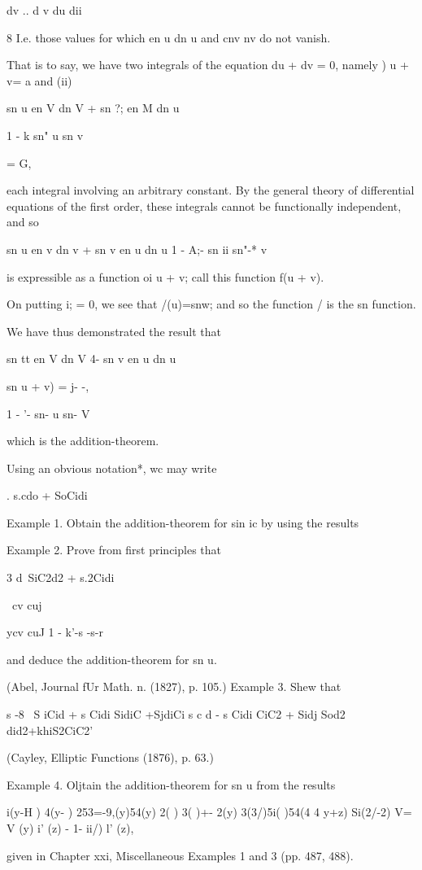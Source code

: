 dv .. d v du dii

8 I.e. those values for which en u dn u and cnv nv do not vanish.

%
%

That is to say, we have two integrals of the equation du + dv = 0,
namely ) u + v= a and (ii)

sn u en V dn V + sn ?; en M dn u

1 - k sn" u sn v

= G,

each integral involving an arbitrary constant. By the general theory
of differential equations of the first order, these integrals cannot
be functionally independent, and so

sn u en v dn v + sn v en u dn u 1 - A;- sn ii sn"-* v

is expressible as a function oi u + v; call this function f(u + v).

On putting i; = 0, we see that /(u)=snw; and so the function / is the
sn function.

We have thus demonstrated the result that

sn tt en V dn V 4- sn v en u dn u

sn u + v) = j- -,

1 - '- sn- u sn- V

which is the addition-theorem.

Using an obvious notation*, wc may write

. s.cdo + SoCidi

Example 1. Obtain the addition-theorem for sin ic by using the results

Example 2. Prove from first principles that

3 d\ SiC2d2 + s.2Cidi\

\ cv cuj

ycv cuJ 1 - k'-s -s-r

and deduce the addition-theorem for sn u.

(Abel, Journal fUr Math. n. (1827), p. 105.) Example 3. Shew that

s -8 \ S iCid + s Cidi SidiC +SjdiCi s c d - s Cidi CiC2 + Sidj Sod2
did2+khiS2CiC2'

(Cayley, Elliptic Functions (1876), p. 63.)

Example 4. Oljtain the addition-theorem for sn u from the results

 i(y-H ) 4(y- ) 253=-9,(y)54(y) 2( ) 3( )+- 2(y) 3(3/)5i( )54(4 4 y+z)
Si(2/-2) V= V (y) i' (z) - 1- ii/) l' (z),

given in Chapter xxi, Miscellaneous Examples 1 and 3 (pp. 487, 488).

